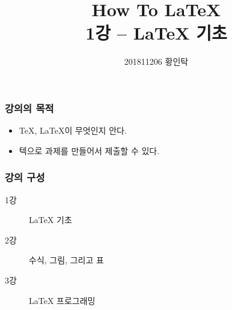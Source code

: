 

\title{How To LaTeX \\ \normalsize \textnormal{1강 -- LaTeX 기초}}
\author{201811206 황인탁}



\maketitle

\begin{frame}
    \frametitle{강의의 목적}

    \begin{itemize}
        \item TeX, LaTeX이 무엇인지 안다.
        \item 텍으로 과제를 만들어서 제출할 수 있다.
    \end{itemize}

\end{frame}

\begin{frame}
    \frametitle{강의 구성}

    \begin{description}
        \item[1강] LaTeX 기초
        \item[2강] 수식, 그림, 그리고 표
        \item[3강] LaTeX 프로그래밍
    \end{description}

\end{frame}

